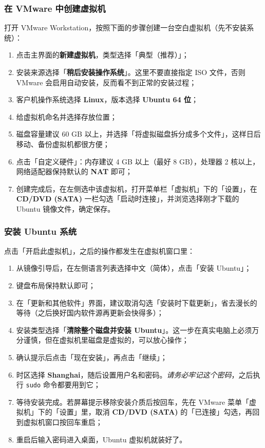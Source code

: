 \documentclass[12pt,a4paper]{ctexbook}
\begin{document}
\subsubsection{在 VMware 中创建虚拟机}

打开 VMware Workstation，按照下面的步骤创建一台空白虚拟机（先不安装系统）：

\begin{enumerate}
    \item 点击主界面的\textbf{新建虚拟机}，类型选择「典型（推荐）」；
    \item 安装来源选择「\textbf{稍后安装操作系统}」。这里不要直接指定 ISO 文件，否则 VMware 会启用自动安装，反而看不到正常的安装过程；
    \item 客户机操作系统选择 \textbf{Linux}，版本选择 \textbf{Ubuntu 64 位}；
    \item 给虚拟机命名并选择存放位置；
    \item 磁盘容量建议 60 GB 以上，并选择「将虚拟磁盘拆分成多个文件」，这样日后移动、备份虚拟机都很方便；
    \item 点击「自定义硬件」：内存建议 4 GB 以上（最好 8 GB），处理器 2 核以上，网络适配器保持默认的 \textbf{NAT} 即可；
    \item 创建完成后，在左侧选中该虚拟机，打开菜单栏「虚拟机」下的「设置」，在 \textbf{CD/DVD (SATA)} 一栏勾选「启动时连接」，并浏览选择刚才下载的 Ubuntu 镜像文件，确定保存。
\end{enumerate}

\subsubsection{安装 Ubuntu 系统}

点击「开启此虚拟机」，之后的操作都发生在虚拟机窗口里：

\begin{enumerate}
    \item 从镜像引导后，在左侧语言列表选择中文（简体），点击「安装 Ubuntu」；
    \item 键盘布局保持默认即可；
    \item 在「更新和其他软件」界面，建议取消勾选「安装时下载更新」，省去漫长的等待（之后换好国内软件源再更新会快得多）；
    \item 安装类型选择「\textbf{清除整个磁盘并安装 Ubuntu}」。这一步在真实电脑上必须万分谨慎，但在虚拟机里磁盘是虚拟的，可以放心操作；
    \item 确认提示后点击「现在安装」，再点击「继续」；
    \item 时区选择 \textbf{Shanghai}，随后设置用户名和密码。\emph{请务必牢记这个密码}，之后执行 \texttt{sudo} 命令都要用到它；
    \item 等待安装完成。若屏幕提示移除安装介质后按回车，先在 VMware 菜单「虚拟机」下的「设置」里，取消 \textbf{CD/DVD (SATA)} 的「已连接」勾选，再回到虚拟机窗口按回车重启；
    \item 重启后输入密码进入桌面，Ubuntu 虚拟机就装好了。
\end{enumerate}
\end{document}
